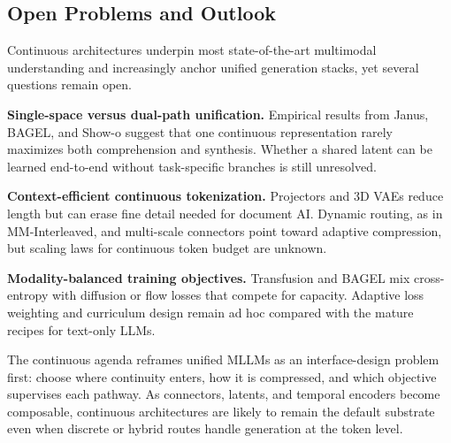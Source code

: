 \subsection{Open Problems and Outlook}
\label{subsec:continuous-outlook}

Continuous architectures underpin most state-of-the-art multimodal understanding and increasingly anchor unified generation stacks, yet several questions remain open.

\textbf{Single-space versus dual-path unification.} Empirical results from Janus, BAGEL, and Show-o suggest that one continuous representation rarely maximizes both comprehension and synthesis. Whether a shared latent can be learned end-to-end without task-specific branches is still unresolved.

\textbf{Context-efficient continuous tokenization.} Projectors and 3D VAEs reduce length but can erase fine detail needed for document AI. Dynamic routing, as in MM-Interleaved, and multi-scale connectors point toward adaptive compression, but scaling laws for continuous token budget are unknown.

\textbf{Modality-balanced training objectives.} Transfusion and BAGEL mix cross-entropy with diffusion or flow losses that compete for capacity. Adaptive loss weighting and curriculum design remain ad hoc compared with the mature recipes for text-only LLMs.

The continuous agenda reframes unified MLLMs as an interface-design problem first: choose where continuity enters, how it is compressed, and which objective supervises each pathway. As connectors, latents, and temporal encoders become composable, continuous architectures are likely to remain the default substrate even when discrete or hybrid routes handle generation at the token level.
